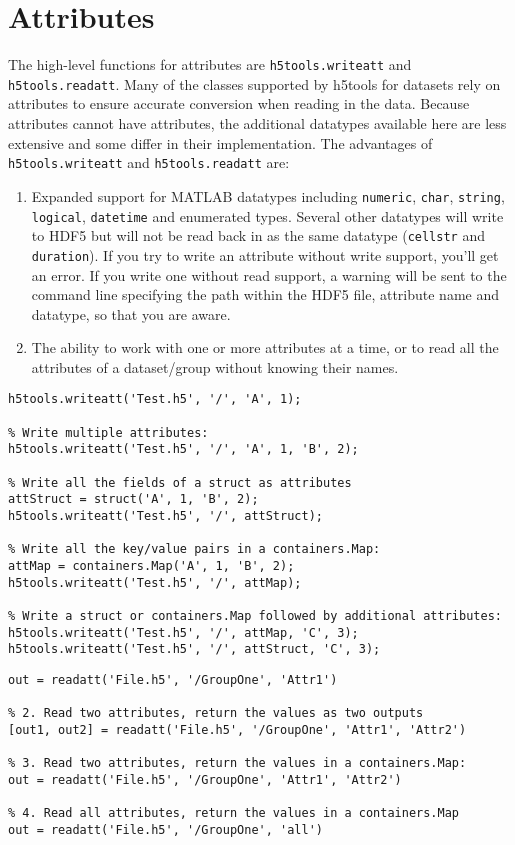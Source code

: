 \documentclass[11pt]{exam}
\newcommand\myfcn[1]{\colorbox{codegray}{\textcolor{codeblue}{\texttt{#1}}}}
\begin{document}
    \section{Attributes}
        \noindent The high-level functions for attributes are \myfcn{h5tools.writeatt} and \myfcn{h5tools.readatt}. Many of the classes supported by h5tools for datasets rely on attributes to ensure accurate conversion when reading in the data. Because attributes cannot have attributes, the additional datatypes available here are less extensive and some differ in their implementation. The advantages of \myfcn{h5tools.writeatt} and \myfcn{h5tools.readatt} are: 
		\begin{enumerate}
			\item Expanded support for MATLAB datatypes including \texttt{numeric}, \texttt{char}, \texttt{string}, \texttt{logical}, \texttt{datetime} and enumerated types. Several other datatypes will write to HDF5 but will not be read back in as the same datatype (\texttt{cellstr} and \texttt{duration}). If you try to write an attribute without write support, you'll get an error. If you write one without read support, a warning will be sent to the command line specifying the path within the HDF5 file, attribute name and datatype, so that you are aware. 
			\item The ability to work with one or more attributes at a time, or to read all the attributes of a dataset/group without knowing their names.
		\end{enumerate}

		\begin{lstlisting}[style=matlab-editor, basicstyle=\mlttfamily\footnotesize]
% Write a single attribute:
h5tools.writeatt('Test.h5', '/', 'A', 1);

% Write multiple attributes:
h5tools.writeatt('Test.h5', '/', 'A', 1, 'B', 2);

% Write all the fields of a struct as attributes
attStruct = struct('A', 1, 'B', 2);
h5tools.writeatt('Test.h5', '/', attStruct);

% Write all the key/value pairs in a containers.Map:
attMap = containers.Map('A', 1, 'B', 2);
h5tools.writeatt('Test.h5', '/', attMap);

% Write a struct or containers.Map followed by additional attributes:
h5tools.writeatt('Test.h5', '/', attMap, 'C', 3);
h5tools.writeatt('Test.h5', '/', attStruct, 'C', 3);
		\end{lstlisting}

		\begin{lstlisting}[style=matlab-editor, basicstyle=\mlttfamily\footnotesize]
% 1. Read a single attribute, return the value
out = readatt('File.h5', '/GroupOne', 'Attr1')

% 2. Read two attributes, return the values as two outputs
[out1, out2] = readatt('File.h5', '/GroupOne', 'Attr1', 'Attr2')

% 3. Read two attributes, return the values in a containers.Map:
out = readatt('File.h5', '/GroupOne', 'Attr1', 'Attr2')

% 4. Read all attributes, return the values in a containers.Map
out = readatt('File.h5', '/GroupOne', 'all')
		\end{lstlisting}
\end{document}

